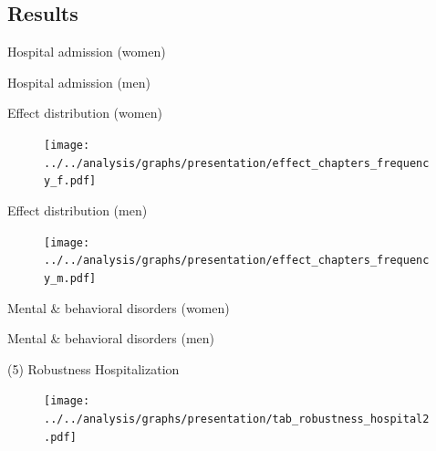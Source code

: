\documentclass[aspectratio=169,handout]{beamer} %
\begin{document}
\subsection*{Results}
\begin{frame}{Hospital admission (women)}\label{HOSPITAL_TAB_WOMEN}\tiny
	
	\hyperlink{HOSPITAL_TAB_TOTAL}{}
\end{frame}
\begin{frame}{Hospital admission (men)}\tiny
	
	\hyperlink{HOSPITAL_TAB_TOTAL}{}
\end{frame}
\begin{frame}{Effect distribution (women)}\label{CHAPTERS_FEMALE}
	\begin{figure}\centering
		\texttt{[image: ../../analysis/graphs/presentation/effect\_chapters\_frequency\_f.pdf]}
	\end{figure}
	\hyperlink{CHAPTERS_TOTAL}{}
\end{frame}
\begin{frame}{Effect distribution (men)}
	\begin{figure}\centering
		\texttt{[image: ../../analysis/graphs/presentation/effect\_chapters\_frequency\_m.pdf]}
	\end{figure}
	\hyperlink{CHAPTERS_TOTAL}{}
\end{frame}

\begin{frame}{Mental \& behavioral disorders (women)}\label{MBD_TAB_WOMEN}
	\tiny
	
	\hyperlink{MBD_TAB_TOTAL}{}
\end{frame}
\begin{frame}{Mental \& behavioral disorders (men)}
	\tiny
	
	\hyperlink{MBD_TAB_TOTAL}{}
\end{frame}
\begin{frame}{(5) Robustness Hospitalization}\label{ROBUSTNESS_TABLE}
\begin{figure}
	\texttt{[image: ../../analysis/graphs/presentation/tab\_robustness\_hospital2.pdf]}
\end{figure}
\hyperlink{ROBUSTNESS}{}
\end{frame}
\end{document}

